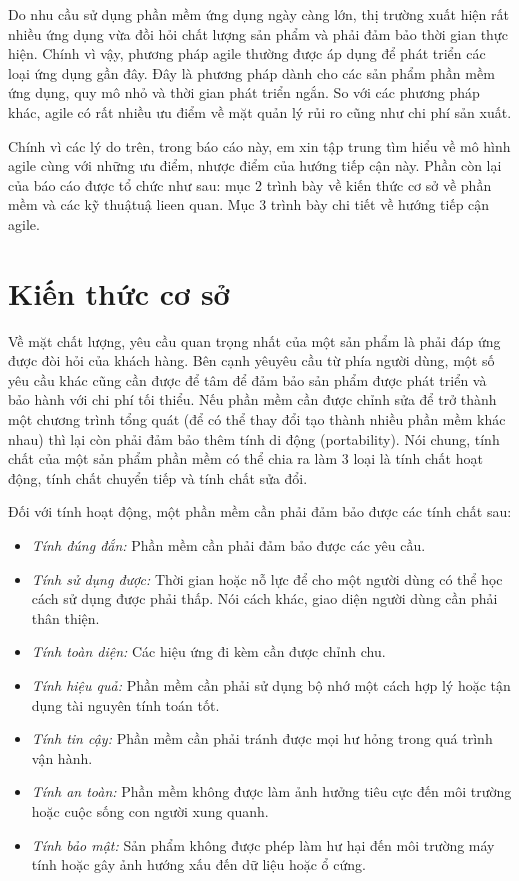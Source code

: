 \documentclass{article}
\begin{document}
Do nhu cầu sử dụng phần mềm ứng dụng ngày càng lớn, thị trường xuất hiện rất nhiều ứng dụng vừa đồi hỏi chất lượng sản phẩm và phải đảm bảo thời gian thực hiện. Chính vì vậy, phương pháp agile thường được áp dụng để phát triển các loại ứng dụng gần đây. Đây là phương pháp dành cho các sản phẩm phần mềm ứng dụng, quy mô nhỏ và thời gian phát triển ngắn. So với các phương pháp khác, agile có rất nhiều ưu điểm về mặt quản lý rủi ro cũng như chi phí sản xuất.

Chính vì các lý do trên, trong báo cáo này, em xin tập trung tìm hiểu về mô hình agile cùng với những ưu điểm, nhược điểm của hướng tiếp cận này. Phần còn lại của báo cáo được tổ chức như sau: mục 2 trình bày về kiến thức cơ sở về phần mềm và các kỹ thuậtuậ lieen quan. Mục 3 trình bày chi tiết về hướng tiếp cận agile.


\section{Kiến thức cơ sở}\label{ktcs}

Về mặt chất lượng, yêu cầu quan trọng nhất của một sản phẩm là phải đáp ứng được đòi hỏi của khách hàng. Bên cạnh yêuyêu cầu từ phía người dùng, một số yêu cầu khác cũng cần được để tâm để đảm bảo sản phẩm được phát triển và bảo hành với chi phí tối thiểu. Nếu phần mềm cần được chỉnh sửa để trở thành một chương trình tổng quát (để có thể thay đổi tạo thành nhiều phần mềm khác nhau) thì lại còn phải đảm bảo thêm tính di động (portability). Nói chung, tính chất của một sản phẩm phần mềm có thể chia ra làm 3 loại là tính chất hoạt động, tính chất chuyển tiếp và tính chất sửa đổi.

Đối với tính hoạt động, một phần mềm cần phải đảm bảo được các tính chất sau:
\begin{itemize}
	\item \textit{Tính đúng đắn:} Phần mềm cần phải đảm bảo được các yêu cầu.
	\item \textit{Tính sử dụng được:} Thời gian hoặc nỗ lực để cho một người dùng có thể học cách sử dụng được phải thấp. Nói cách khác, giao diện người dùng cần phải thân thiện.
	\item \textit{Tính toàn diện:} Các hiệu ứng đi kèm cần được chỉnh chu.
	\item \textit{Tính hiệu quả:} Phần mềm cần phải sử dụng bộ nhớ một cách hợp lý hoặc tận dụng tài nguyên tính toán tốt.
	\item \textit{Tính tin cậy:} Phần mềm cần phải tránh được mọi hư hỏng trong quá trình vận hành.
	
	\item \textit{Tính an toàn:} Phần mềm không được làm ảnh hưởng tiêu cực đến môi trường hoặc cuộc sống con người xung quanh.
	\item \textit{Tính bảo mật:} Sản phẩm không được phép làm hư hại đến môi trường máy tính hoặc gây ảnh hướng xấu đến dữ liệu hoặc ổ cứng.
	\end{itemize}
	
\end{document}
